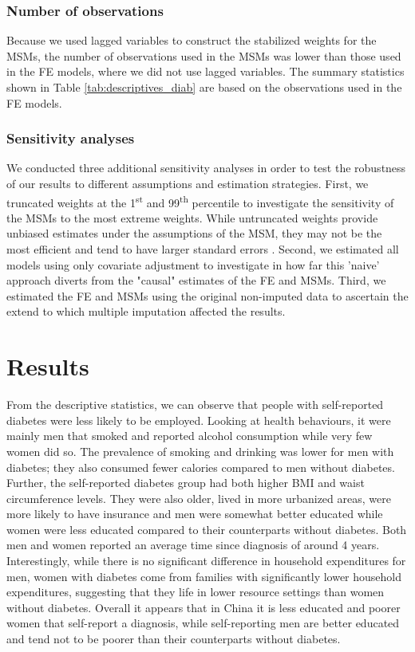 \subsubsection*{Number of observations}

Because we used lagged variables to construct the stabilized weights for the \acp{MSM}, the number of observations used in the \acp{MSM} was lower than those used in the \ac{FE} models, where we did not use lagged variables. The summary statistics shown in Table \ref{tab:descriptives_diab} are based on the observations used in the \ac{FE} models.

\subsubsection*{Sensitivity analyses}

We conducted three additional sensitivity analyses in order to test the robustness of our results to different assumptions and estimation strategies.
First, we truncated weights at the 1\textsuperscript{st} and 99\textsuperscript{th} percentile to investigate the sensitivity of the \acp{MSM} to the most extreme weights. While untruncated weights provide unbiased estimates under the assumptions of the \ac{MSM}, they may not be the most efficient and tend to have larger standard errors \parencite{Cole2008}. Second, we estimated all models using only covariate adjustment to investigate in how far this 'naive' approach diverts from the "causal" estimates of the \ac{FE} and \acp{MSM}. Third, we estimated the \ac{FE} and \acp{MSM} using the original non-imputed data to ascertain the extend to which multiple imputation affected the results.

\section{\label{sec:Results5}Results}

From the descriptive statistics, we can observe that people with self-reported diabetes were less likely to be employed. Looking at health behaviours, it were mainly men that smoked and reported alcohol consumption while very few women did so. The prevalence of smoking and drinking was lower for men with diabetes; they also consumed fewer calories compared to men without diabetes. Further, the self-reported diabetes group had both higher \ac{BMI} and waist circumference levels. They were also older, lived in more urbanized areas, were more likely to have insurance and men were somewhat better educated while women were less educated compared to their counterparts without diabetes. Both men and women reported an average time since diagnosis of around 4 years. Interestingly, while there is no significant difference in household expenditures for men, women with diabetes come from families with significantly lower household expenditures, suggesting that they life in lower resource settings than women without diabetes. Overall it appears that in China it is less educated and poorer women that self-report a diagnosis, while self-reporting men are better educated and tend not to be poorer than their counterparts without diabetes.



